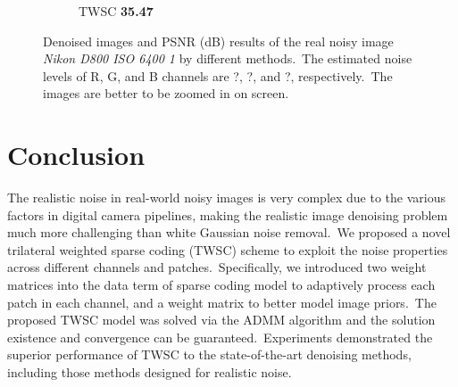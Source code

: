 \begin{figure}
\begin{subfigure}[t]{0.19\textwidth}
		\caption{TWSC \textbf{35.47}}
    \end{subfigure}
    \caption{Denoised images and PSNR (dB) results of the real noisy image \textsl{Nikon D800 ISO 6400 1} \cite{crosschannel2016} by different methods.\ The estimated noise levels of R, G, and B channels are ?, ?, and ?, respectively.\ The images are better to be zoomed in on screen.}
    \label{fig3}
\end{figure}



\section{Conclusion}

The realistic noise in real-world noisy images is very complex due to the various factors in digital camera pipelines, making the realistic image denoising problem much more challenging than white Gaussian noise removal.\ We proposed a novel trilateral weighted sparse coding (TWSC) scheme to exploit the noise properties across different channels and patches.\ Specifically, we introduced two weight matrices into the data term of sparse coding model to adaptively process each patch in each channel, and a weight matrix to better model image priors.\ The proposed TWSC model was solved via the ADMM algorithm and the solution existence and convergence can be guaranteed.\ Experiments demonstrated the superior performance of TWSC to the state-of-the-art denoising methods, including those methods designed for realistic noise.